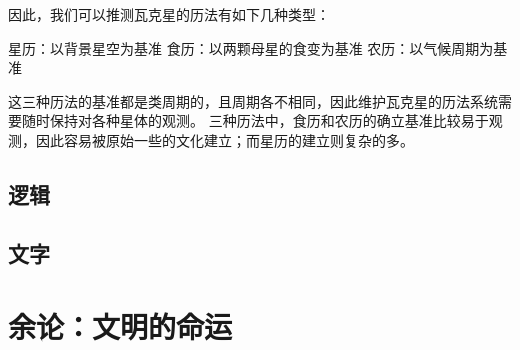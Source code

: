 \documentclass[a4paper,10.5pt]{book}
\begin{document}
因此，我们可以推测瓦克星的历法有如下几种类型：

星历：以背景星空为基准
食历：以两颗母星的食变为基准
农历：以气候周期为基准

这三种历法的基准都是类周期的，且周期各不相同，因此维护瓦克星的历法系统需要随时保持对各种星体的观测。
三种历法中，食历和农历的确立基准比较易于观测，因此容易被原始一些的文化建立；而星历的建立则复杂的多。

\section{逻辑}

\section{文字}




\chapter{余论：文明的命运}



\end{document}
